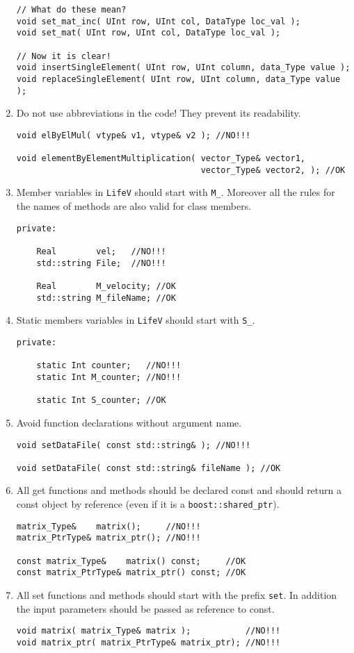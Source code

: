\documentclass[a4paper]{article}
\begin{document}
\begin{enumerate}
\begin{lstlisting}
// What do these mean?
void set_mat_inc( UInt row, UInt col, DataType loc_val );
void set_mat( UInt row, UInt col, DataType loc_val );

// Now it is clear!
void insertSingleElement( UInt row, UInt column, data_Type value );
void replaceSingleElement( UInt row, UInt column, data_Type value );

  \end{lstlisting}
  \item Do not use abbreviations in the code! They prevent its readability.
\begin{lstlisting}
void elByElMul( vtype& v1, vtype& v2 ); //NO!!!

void elementByElementMultiplication( vector_Type& vector1,
                                     vector_Type& vector2, ); //OK
\end{lstlisting}
  \item Member variables in \texttt{LifeV} should start with \texttt{M\_}. Moreover all the rules for the names of methods are also valid for class members.
\begin{lstlisting}
private:

    Real        vel;   //NO!!!
    std::string File;  //NO!!!

    Real        M_velocity; //OK
    std::string M_fileName; //OK
\end{lstlisting}
  \item Static members variables in \texttt{LifeV} should start with \texttt{S\_}.
\begin{lstlisting}
private:

    static Int counter;   //NO!!!
    static Int M_counter; //NO!!!

    static Int S_counter; //OK
\end{lstlisting}
  \item Avoid function declarations without argument name.
\begin{lstlisting}
void setDataFile( const std::string& ); //NO!!!

void setDataFile( const std::string& fileName ); //OK
\end{lstlisting}
  \item All get functions and methods should be declared const and should return a const object by reference (even if it is a \texttt{boost::shared\_ptr}).
\begin{lstlisting}
matrix_Type&    matrix();     //NO!!!
matrix_PtrType& matrix_ptr(); //NO!!!

const matrix_Type&    matrix() const;     //OK
const matrix_PtrType& matrix_ptr() const; //OK
\end{lstlisting}
  \item All set functions and methods should start with the prefix \texttt{set}. In addition the input parameters should be passed as reference to const.
\begin{lstlisting}
void matrix( matrix_Type& matrix );           //NO!!!
void matrix_ptr( matrix_PtrType& matrix_ptr); //NO!!!


\end{lstlisting}
\end{enumerate}
\end{document}
